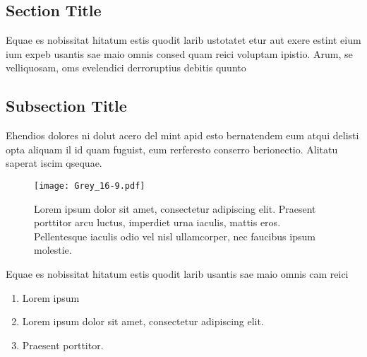 \documentclass[
]{ImperialPoster}
\begin{document}
\begin{multicols}{3}
	\columnbreak %
	
	
	\section{Section Title}
	
	Equae es nobissitat hitatum estis quodit larib ustotatet etur aut exere estint eium ium expeb usantis sae maio omnis consed quam reici voluptam ipistio. Arum, se velliquosam, oms evelendici derroruptius debitis quunto
	
	\subsection{Subsection Title}
	
	Ehendios \textcolor{ICLBlue}{dolores} ni dolut acero del mint apid esto bernatendem eum \textcolor{ICLBlue}{atqui delisti opta} aliquam il id quam fuguist, eum rerferesto conserro berionectio. Alitatu saperat iscim qsequae.
	
	\vspace{0.017\textheight} %
	
	\begin{figure}[H] %
		\texttt{[image: Grey\_16-9.pdf]} %
		\parbox[b]{0.66\textwidth}{\caption{Lorem ipsum dolor sit amet, consectetur adipiscing elit. Praesent porttitor arcu luctus, imperdiet urna iaculis, mattis eros. Pellentesque iaculis odio vel nisl ullamcorper, nec faucibus ipsum molestie.}} %
	\end{figure}
	
	
	Equae es nobissitat hitatum estis quodit larib usantis sae maio omnis cam reici
	
	
	\begin{enumerate}
		\item Lorem ipsum
		\item Lorem ipsum dolor sit amet, consectetur adipiscing elit.
		\item Praesent porttitor.
	\end{enumerate}
	

\end{multicols}
\end{document}
